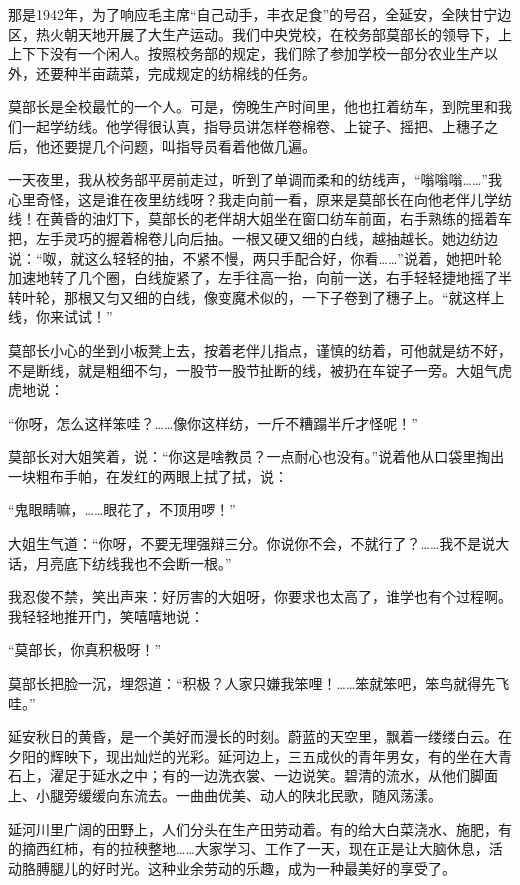\documentclass[12pt,UTF-8,openany]{ctexbook}
\begin{document}
\begin{large}
    
    那是1942年，为了响应毛主席“自己动手，丰衣足食”的号召，全延安，全陕甘宁边区，热火朝天地开展了大生产运动。我们中央党校，在校务部莫部长的领导下，上上下下没有一个闲人。按照校务部的规定，我们除了参加学校一部分农业生产以外，还要种半亩蔬菜，完成规定的纺棉线的任务。
    
    莫部长是全校最忙的一个人。可是，傍晚生产时间里，他也扛着纺车，到院里和我们一起学纺线。他学得很认真，指导员讲怎样卷棉卷、上锭子、摇把、上穗子之后，他还要提几个问题，叫指导员看着他做几遍。
    
    一天夜里，我从校务部平房前走过，听到了单调而柔和的纺线声，“嗡嗡嗡……”我心里奇怪，这是谁在夜里纺线呀？我走向前一看，原来是莫部长在向他老伴儿学纺线！在黄昏的油灯下，莫部长的老伴胡大姐坐在窗口纺车前面，右手熟练的摇着车把，左手灵巧的握着棉卷儿向后抽。一根又硬又细的白线，越抽越长。她边纺边说：“呶，就这么轻轻的抽，不紧不慢，两只手配合好，你看……”说着，她把叶轮加速地转了几个圈，白线旋紧了，左手往高一抬，向前一送，右手轻轻捷地摇了半转叶轮，那根又匀又细的白线，像变魔术似的，一下子卷到了穗子上。“就这样上线，你来试试！”
    
    莫部长小心的坐到小板凳上去，按着老伴儿指点，谨慎的纺着，可他就是纺不好，不是断线，就是粗细不匀，一股节一股节扯断的线，被扔在车锭子一旁。大姐气虎虎地说：
    
    “你呀，怎么这样笨哇？……像你这样纺，一斤不糟蹋半斤才怪呢！”
    
    莫部长对大姐笑着，说：“你这是啥教员？一点耐心也没有。”说着他从口袋里掏出一块粗布手帕，在发红的两眼上拭了拭，说：
    
    “鬼眼睛嘛，……眼花了，不顶用啰！”
    
    大姐生气道：“你呀，不要无理强辩三分。你说你不会，不就行了？……我不是说大话，月亮底下纺线我也不会断一根。”
    
    我忍俊不禁，笑出声来：好厉害的大姐呀，你要求也太高了，谁学也有个过程啊。我轻轻地推开门，笑嘻嘻地说：
    
    “莫部长，你真积极呀！”
    
    莫部长把脸一沉，埋怨道：“积极？人家只嫌我笨哩！……笨就笨吧，笨鸟就得先飞哇。”
    
    延安秋日的黄昏，是一个美好而漫长的时刻。蔚蓝的天空里，飘着一缕缕白云。在夕阳的辉映下，现出灿烂的光彩。延河边上，三五成伙的青年男女，有的坐在大青石上，濯足于延水之中；有的一边洗衣裳、一边说笑。碧清的流水，从他们脚面上、小腿旁缓缓向东流去。一曲曲优美、动人的陕北民歌，随风荡漾。
    
    延河川里广阔的田野上，人们分头在生产田劳动着。有的给大白菜浇水、施肥，有的摘西红柿，有的拉秧整地……大家学习、工作了一天，现在正是让大脑休息，活动胳膊腿儿的好时光。这种业余劳动的乐趣，成为一种最美好的享受了。
    

\end{large}
\end{document}

